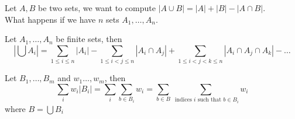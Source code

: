 \documentclass[../main.tex]{subfiles}
\begin{document}
Let $A,B$ be two sets, we want to compute $|A \cup B| = |A| + |B| - |A \cap B|$.\\
What happens if we have $n$ sets $A_1, \ldots, A_n$.\\
\begin{thm}
	Let $A_1, \ldots, A_n$ be finite sets, then
	\[ 
		| \bigcup A_i| = \sum_{1 \leq i \leq n} |A_i| - \sum_{1 \leq i < j \leq n} |A_i \cap A_j| + \sum_{1 \leq i < j < k \leq n} |A_i \cap A_j \cap A_k| - \ldots
	\]
	
	Let $B_1, \ldots, B_m$ and $w_1 \ldots, w_m$, then
	\[ 
		\sum_{i}  w_i |B_i| = \sum_{i} \sum_{b\in B_i} w_i = \sum_{b \in B} \sum_{ \text{ indices } i \text{ such that } b \in B_i} w_i
	\]
	where $B= \bigcup B_i$
	
\end{thm}
\end{document}
